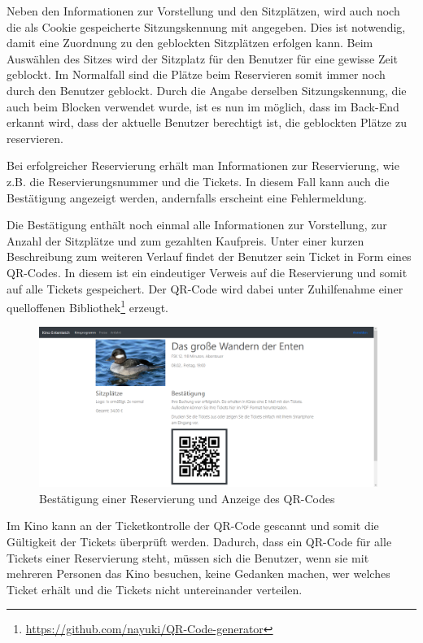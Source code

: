 Neben den Informationen zur Vorstellung und den Sitzplätzen, wird auch noch die als Cookie gespeicherte Sitzungskennung mit angegeben.
Dies ist notwendig, damit eine Zuordnung zu den geblockten Sitzplätzen erfolgen kann.
Beim Auswählen des Sitzes wird der Sitzplatz für den Benutzer für eine gewisse Zeit geblockt.
Im Normalfall sind die Plätze beim Reservieren somit immer noch durch den Benutzer geblockt.
Durch die Angabe derselben Sitzungskennung, die auch beim Blocken verwendet wurde, ist es nun im möglich, dass im Back-End erkannt wird, dass der aktuelle Benutzer berechtigt ist, die geblockten Plätze zu reservieren.

Bei erfolgreicher Reservierung erhält man Informationen zur Reservierung, wie z.B. die Reservierungsnummer und die Tickets.
In diesem Fall kann auch die Bestätigung angezeigt werden, andernfalls erscheint eine Fehlermeldung.

Die Bestätigung enthält noch einmal alle Informationen zur Vorstellung, zur Anzahl der Sitzplätze und zum gezahlten Kaufpreis.
Unter einer kurzen Beschreibung zum weiteren Verlauf findet der Benutzer sein Ticket in Form eines \acs{QR-Code}s.
In diesem ist ein eindeutiger Verweis auf die Reservierung und somit auf alle Tickets gespeichert.
Der \acs{QR-Code} wird dabei unter Zuhilfenahme einer quelloffenen Bibliothek\footnote{\url{https://github.com/nayuki/QR-Code-generator}} erzeugt.

\begin{figure}[ht]
	\centering
	\includegraphics[width=0.98\textwidth]{img/screenshots/vorstellung04}
	\captionsetup{format=hang}
	\caption{Bestätigung einer Reservierung und Anzeige des \acs{QR-Code}s}
	\label{fig:vorstellung04}
\end{figure}

Im Kino kann an der Ticketkontrolle der \acs{QR-Code} gescannt und somit die Gültigkeit der Tickets überprüft werden.
Dadurch, dass ein \acs{QR-Code} für alle Tickets einer Reservierung steht, müssen sich die Benutzer, wenn sie mit mehreren Personen das Kino besuchen, keine Gedanken machen, wer welches Ticket erhält und die Tickets nicht untereinander verteilen. %
